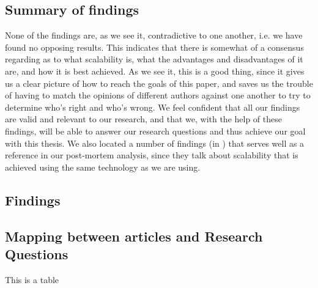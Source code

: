 \documentclass{article}
\begin{document}
{\subsection{Summary of findings}

None of the findings are, as we see it, contradictive to one another, i.e. we
have found no opposing results.  This indicates that there is somewhat of a
consensus regarding as to what scalability is, what the advantages and
disadvantages of it are, and how it is best achieved. As we see it, this is a
good thing, since it gives us a clear picture of how to reach the goals of this
paper, and saves us the trouble of having to match the opinions of different
authors against one another to try to determine who's right and who's wrong.
We feel confident that all our findings are valid and relevant to our research,
and that we, with the help of these findings, will be able to answer our
research questions and thus achieve our goal with this thesis.
We also located a number of findings
(in \cite{gropp1996high}\cite{miller2002pympi}\cite{millerparallel}) that
serves well as a reference in our post-mortem analysis, since they talk about
scalability that is achieved using the same technology as we are using.

\subsection{Findings}

\subsection{Mapping between articles and Research Questions}
This is a table 

}
\end{document}
